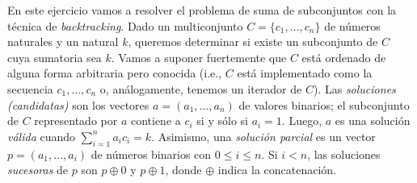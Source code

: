 
\item En este ejercicio vamos a resolver el problema de suma de subconjuntos con la técnica de \textit{backtracking}.  Dado un multiconjunto $C = \{c_1, \ldots, c_n\}$ de números naturales y un natural $k$, queremos determinar si existe un subconjunto de $C$ cuya sumatoria sea $k$.  Vamos a suponer fuertemente que $C$ está ordenado de alguna forma arbitraria pero conocida (i.e., $C$ está implementado como la secuencia $c_1, \ldots, c_n$ o, análogamente, tenemos un iterador de $C$).  Las \emph{soluciones (candidatas)} son los vectores $a = (a_1, \ldots, a_n)$ de valores binarios; el subconjunto de $C$ representado por $a$ contiene a $c_i$ si y sólo si $a_i = 1$.  Luego, $a$ es una solución \emph{válida} cuando $\sum_{i=1}^n a_i c_i = k$.  Asimismo, una \emph{solución parcial} es un vector $p = (a_1, \ldots, a_i)$ de números binarios con $0 \leq i \leq n$.  Si $i < n$, las soluciones \emph{sucesoras} de $p$ son $p \oplus 0$ y $p \oplus 1$, donde $\oplus$ indica la concatenación.
\label{ejercicioSumaDeSubconjuntos}

